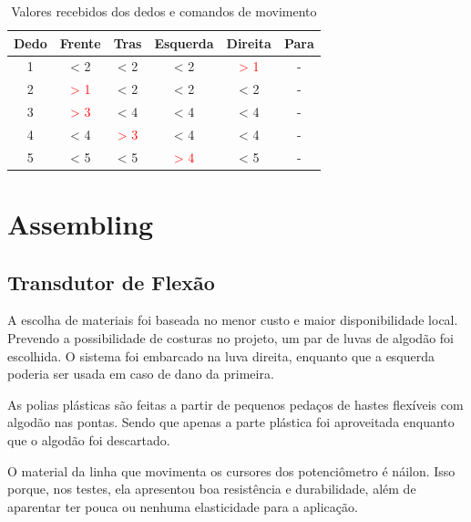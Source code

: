 \documentclass[
	12pt,				%
	openright,			%
	oneside,			%
	a4paper,			%
	english,			%
	brazil				%
	]{abntex2}
\begin{document}
		\begin{table}[H]
     \centering
     \caption{Valores recebidos dos dedos e comandos de movimento}
     \begin{tabular}{c|ccccc}
			 \midrule
			 Dedo &       Frente			 & 				Tras				& 		Esquerda			 & 		Direita					& Para	\\
			 \midrule
			 1    & < 2   						 & < 2   							& < 2    						 &\textcolor{red}{> 1}&	-			\\
			 2    &\textcolor{red}{> 1}& < 2   							& < 2  	 						 & < 2   							&	-			\\
			 3    &\textcolor{red}{> 3}& < 4   							& < 4   						 & < 4   							&	-			\\
			 4    & < 4   						 &\textcolor{red}{> 3}& < 4 							 & < 4   							&	-			\\
			 5    & < 5   						 & < 5   							&\textcolor{red}{> 4}& < 5   							&	-			\\
			 \midrule
     \end{tabular}
     \label{Tab:dedos-e-comandos1}
   \end{table}





		\section{Assembling}

		\subsection{Transdutor de Flexão}

		A escolha de materiais foi baseada no menor custo e maior disponibilidade local. Prevendo a possibilidade de costuras no projeto, um par de luvas de algodão foi escolhida. O sistema foi embarcado na luva direita, enquanto que a esquerda poderia ser usada em caso de dano da primeira.
		
		As polias plásticas são feitas a partir de pequenos pedaços de hastes flexíveis com algodão nas pontas. Sendo que apenas a parte plástica foi aproveitada enquanto que o algodão foi descartado.

		O material da linha que movimenta os cursores dos potenciômetro é náilon. Isso porque, nos testes, ela apresentou boa resistência e durabilidade, além de aparentar ter pouca ou nenhuma elasticidade para a aplicação.
\end{document}
